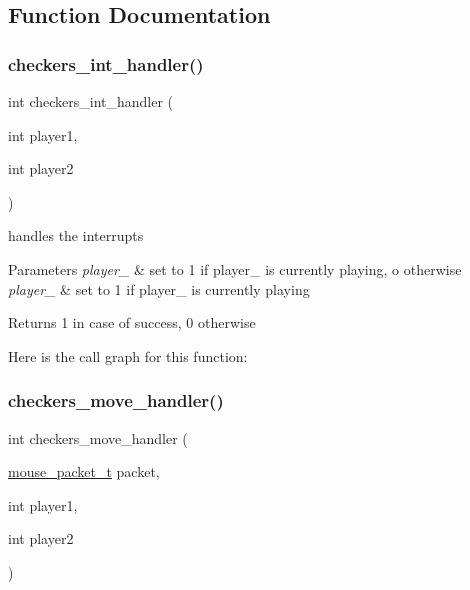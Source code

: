 \subsection{Function Documentation}
\hypertarget{group___checkers_ga61f35c6c9bba94dcd5028e185f3ae3f6}{}\label{group___checkers_ga61f35c6c9bba94dcd5028e185f3ae3f6} 
\subsubsection{\texorpdfstring{checkers\+\_\+int\+\_\+handler()}{checkers\_int\_handler()}}
{\footnotesize\ttfamily int checkers\+\_\+int\+\_\+handler (\begin{DoxyParamCaption}\item[{int}]{player1,  }\item[{int}]{player2 }\end{DoxyParamCaption})}



handles the interrupts 


\begin{DoxyParams}{Parameters}
{\em player\+\_} & set to 1 if player\+\_ is currently playing, o otherwise \\
\hline
{\em player\+\_} & set to 1 if player\+\_ is currently playing \\
\hline
\end{DoxyParams}
\begin{DoxyReturn}{Returns}
1 in case of success, 0 otherwise 
\end{DoxyReturn}
Here is the call graph for this function\+:
\hypertarget{group___checkers_gac38396bd73b19b176b4016524f63f8aa}{}\label{group___checkers_gac38396bd73b19b176b4016524f63f8aa} 
\subsubsection{\texorpdfstring{checkers\+\_\+move\+\_\+handler()}{checkers\_move\_handler()}}
{\footnotesize\ttfamily int checkers\+\_\+move\+\_\+handler (\begin{DoxyParamCaption}\item[{\hyperlink{structmouse__packet__t}{mouse\+\_\+packet\+\_\+t}}]{packet,  }\item[{int}]{player1,  }\item[{int}]{player2 }\end{DoxyParamCaption})}



